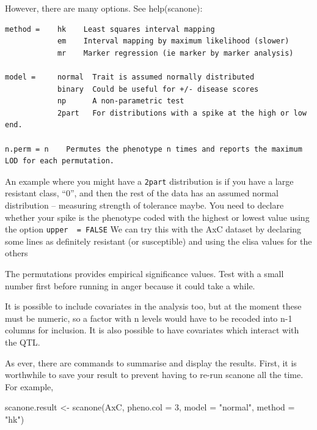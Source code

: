 \documentclass[
]{book}
\newenvironment{Shaded}{\begin{snugshade}}{\end{snugshade}}
\newcommand{\AttributeTok}[1]{\textcolor[rgb]{0.77,0.63,0.00}{#1}}
\newcommand{\DecValTok}[1]{\textcolor[rgb]{0.00,0.00,0.81}{#1}}
\newcommand{\FunctionTok}[1]{\textcolor[rgb]{0.00,0.00,0.00}{#1}}
\newcommand{\NormalTok}[1]{#1}
\newcommand{\OtherTok}[1]{\textcolor[rgb]{0.56,0.35,0.01}{#1}}
\newcommand{\StringTok}[1]{\textcolor[rgb]{0.31,0.60,0.02}{#1}}
\begin{document}
However, there are many options. See help(scanone):

\begin{verbatim}
method =    hk    Least squares interval mapping   
            em    Interval mapping by maximum likelihood (slower)   
            mr    Marker regression (ie marker by marker analysis) 

model =     normal  Trait is assumed normally distributed                   
            binary  Could be useful for +/- disease scores
            np      A non-parametric test 
            2part   For distributions with a spike at the high or low end.   

n.perm = n    Permutes the phenotype n times and reports the maximum LOD for each permutation. 
\end{verbatim}

An example where you might have a \texttt{2part} distribution is if you have a large resistant class, ``0'', and then the rest of the data has an assumed normal distribution -- measuring strength of tolerance maybe. You need to declare whether your spike is the phenotype coded with the highest or lowest value using the option \texttt{upper\ \ =\ FALSE} We can try this with the AxC dataset by declaring some lines as definitely resistant (or susceptible) and using the elisa values for the others

The permutations provides empirical significance values. Test with a small number first before running in anger because it could take a while.

It is possible to include covariates in the analysis too, but at the moment these must be numeric, so a factor with n levels would have to be recoded into n-1 columns for inclusion. It is also possible to have covariates which interact with the QTL.

As ever, there are commands to summarise and display the results. First, it is worthwhile to save your result to prevent having to re-run scanone all the time. For example,

\begin{Shaded}
\begin{Highlighting}[]
\NormalTok{scanone.result }\OtherTok{\textless{}{-}} \FunctionTok{scanone}\NormalTok{(AxC, }\AttributeTok{pheno.col =} \DecValTok{3}\NormalTok{, }\AttributeTok{model =} \StringTok{"normal"}\NormalTok{, }
    \AttributeTok{method =} \StringTok{"hk"}\NormalTok{)}
\end{Highlighting}
\end{Shaded}
\end{document}
